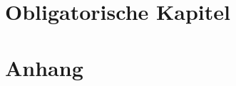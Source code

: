 


  
  
  
  \tableofcontents\thispagestyle{fancy}
  \part{Obligatorische Kapitel}
  
  \part{Anhang}
  
